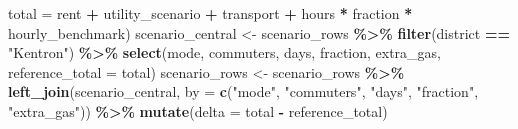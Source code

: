 \documentclass[
]{article}
\newenvironment{Shaded}{\begin{snugshade}}{\end{snugshade}}
\newcommand{\AttributeTok}[1]{\textcolor[rgb]{0.13,0.29,0.53}{#1}}
\newcommand{\FunctionTok}[1]{\textcolor[rgb]{0.13,0.29,0.53}{\textbf{#1}}}
\newcommand{\NormalTok}[1]{#1}
\newcommand{\OtherTok}[1]{\textcolor[rgb]{0.56,0.35,0.01}{#1}}
\newcommand{\SpecialCharTok}[1]{\textcolor[rgb]{0.81,0.36,0.00}{\textbf{#1}}}
\newcommand{\StringTok}[1]{\textcolor[rgb]{0.31,0.60,0.02}{#1}}
\begin{document}
\begin{Shaded}
\begin{Highlighting}[]
  \AttributeTok{total =}\NormalTok{ rent }\SpecialCharTok{+}\NormalTok{ utility\_scenario }\SpecialCharTok{+}\NormalTok{ transport }\SpecialCharTok{+}\NormalTok{ hours }\SpecialCharTok{*}\NormalTok{ fraction }\SpecialCharTok{*}\NormalTok{ hourly\_benchmark)}
\NormalTok{scenario\_central }\OtherTok{\textless{}{-}}\NormalTok{ scenario\_rows }\SpecialCharTok{\%\textgreater{}\%} \FunctionTok{filter}\NormalTok{(district }\SpecialCharTok{==} \StringTok{"Kentron"}\NormalTok{) }\SpecialCharTok{\%\textgreater{}\%}
  \FunctionTok{select}\NormalTok{(mode, commuters, days, fraction, extra\_gas, }\AttributeTok{reference\_total =}\NormalTok{ total)}
\NormalTok{scenario\_rows }\OtherTok{\textless{}{-}}\NormalTok{ scenario\_rows }\SpecialCharTok{\%\textgreater{}\%} \FunctionTok{left\_join}\NormalTok{(scenario\_central,}
  \AttributeTok{by =} \FunctionTok{c}\NormalTok{(}\StringTok{"mode"}\NormalTok{, }\StringTok{"commuters"}\NormalTok{, }\StringTok{"days"}\NormalTok{, }\StringTok{"fraction"}\NormalTok{, }\StringTok{"extra\_gas"}\NormalTok{)) }\SpecialCharTok{\%\textgreater{}\%} \FunctionTok{mutate}\NormalTok{(}\AttributeTok{delta =}\NormalTok{ total }\SpecialCharTok{{-}}\NormalTok{ reference\_total)}


\end{Highlighting}
\end{Shaded}
\end{document}
